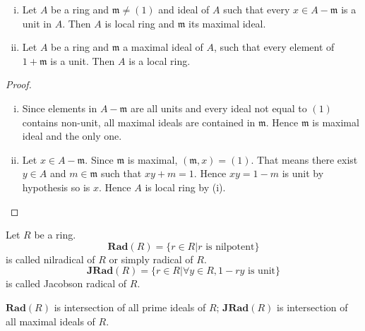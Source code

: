 \documentclass{amsart}
\begin{document}
\begin{secprop}[\ref{}]
	\begin{enumerate}[(i)]
		\item Let $A$ be a ring and $\mathfrak{m} \neq (1)$ and ideal of $A$ such that every $x \in A - \mathfrak{m}$ is a unit in $A$. Then $A$ is local ring and $\mathfrak{m}$ its maximal ideal.
		\item Let $A$ be a ring and $\mathfrak{m}$ a maximal ideal of $A$, such that every element of $1+ \mathfrak{m}$ is a unit. Then $A$ is a local ring.
	\end{enumerate}
\end{secprop}
\begin{proof}
	\begin{enumerate}[(i)]
		\item Since elements in $A-\mathfrak{m}$ are all units and every ideal not equal to $(1)$ contains non-unit, all maximal ideals are contained in $\mathfrak{m}$. Hence $\mathfrak{m}$ is maximal ideal and the only one.
		\item Let $x \in A- \mathfrak{m}$. Since $\mathfrak{m}$ is maximal, $(\mathfrak{m},x)=(1)$. That means there exist $y \in A$ and $ m \in \mathfrak{m}$ such that $xy +m =1$. Hence $xy=1-m$ is unit by hypothesis so is $x$. Hence $A$ is local ring by (i).
	\end{enumerate}
\end{proof}

\begin{secdefn}
	Let $R$ be a ring.
	\[
	\mathbf{Rad}(R)=\big\{ r \in R | r \text{ is nilpotent}\big\}
	\]
	is called nilradical of $R$ or simply radical of $R$.
	\[
	\mathbf{JRad}(R)=\big\{ r \in R| \forall y \in R, 1- ry\text{ is unit}\big\}
	\]
	is called Jacobson radical of $R$.
\end{secdefn}
\begin{secprop}
	$\mathbf{Rad}(R)$ is intersection of all prime ideals of $R$; $\mathbf{JRad}(R)$ is intersection of all maximal ideals of $R$.
\end{secprop}
\end{document}
